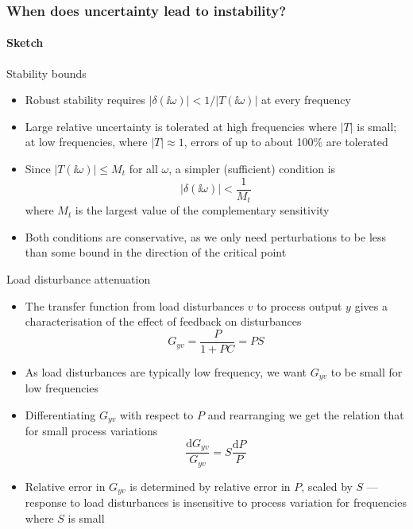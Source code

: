 \documentclass[10pt]{beamer-control}
\begin{document}
\begin{frame}
\frametitle{When does uncertainty lead to instability?}
\framesubtitle{Sketch}

\end{frame}


\begin{frame}{Stability bounds}
	\begin{itemize}
		\item Robust stability requires $|\delta(\ii\omega)| < 1/|T(\ii\omega)|$ at every frequency
		\item Large relative uncertainty is tolerated at high frequencies where $|T|$ is small; at low frequencies, where $|T|\approx 1$, errors of up to about 100\% are tolerated
		\item Since $|T(\ii\omega)| \leq M_t$ for all $\omega$, a simpler (sufficient) condition is
		\begin{equation}|\delta(\ii\omega)| < \frac{1}{M_t}\end{equation}
		where $M_t$ is the largest value of the complementary sensitivity
		\item Both conditions are conservative, as we only need perturbations to be less than some bound in the direction of the critical point
	\end{itemize}
\end{frame}





\begin{frame}{Load disturbance attenuation}
\begin{itemize}
\item The transfer function from load disturbances $v$ to process output $y$ gives a characterisation of the effect of feedback on disturbances
\begin{equation}G_{yv}=\frac{P}{1+PC}=PS\end{equation}
\item As load disturbances are typically low frequency, we want $G_{yv}$ to be small for low frequencies
\item Differentiating $G_{yv}$ with respect to $P$ and rearranging we get the relation that for small process variations
\begin{equation}\frac{\mathrm{d}G_{yv}}{G_{yv}}=S\frac{\mathrm{d}P}{P}\end{equation}
\item Relative error in $G_{yv}$ is determined by relative error in $P$, scaled by $S$ --- response to load disturbances is insensitive to process variation for frequencies where $S$ is small
\end{itemize}
\end{frame}
\end{document}
